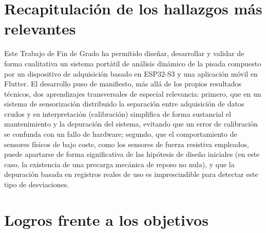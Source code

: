 \begin{IAtext}

\section{Recapitulación de los hallazgos más relevantes}

Este Trabajo de Fin de Grado ha permitido diseñar, desarrollar y validar de forma cualitativa un sistema portátil de análisis dinámico de la pisada compuesto por un dispositivo de adquisición basado en ESP32-S3 y una aplicación móvil en Flutter. El desarrollo puso de manifiesto, más allá de los propios resultados técnicos, dos aprendizajes transversales de especial relevancia: primero, que en un sistema de sensorización distribuido la separación entre adquisición de datos crudos y su interpretación (calibración) simplifica de forma sustancial el mantenimiento y la depuración del sistema, evitando que un error de calibración se confunda con un fallo de hardware; segundo, que el comportamiento de sensores físicos de bajo coste, como los sensores de fuerza resistiva empleados, puede apartarse de forma significativa de las hipótesis de diseño iniciales (en este caso, la existencia de una precarga mecánica de reposo no nula), y que la depuración basada en registros reales de uso es imprescindible para detectar este tipo de desviaciones.

\section{Logros frente a los objetivos}


\end{IAtext}
